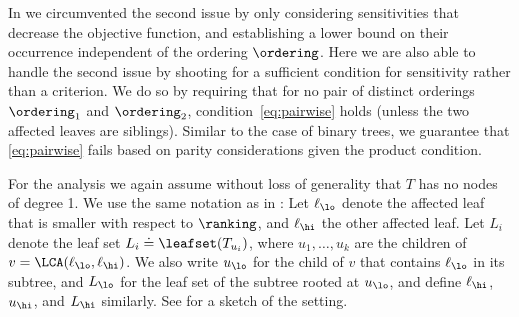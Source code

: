 In  we circumvented the second issue by only considering sensitivities that decrease the objective function, and establishing a lower bound on their occurrence independent of the ordering $\ordering$. Here we are also able to handle the second issue by shooting for a sufficient condition for sensitivity rather than a criterion. We do so by requiring that for no pair of distinct orderings $\ordering_1$ and $\ordering_2$, condition~\eqref{eq:pairwise} holds (unless the two affected leaves are siblings). Similar to the case of binary trees, we guarantee that \eqref{eq:pairwise} fails based on parity considerations given the product condition. 

For the analysis we again assume without loss of generality that $T$ has no nodes of degree 1. We use the same notation as in : Let  $\ell_\lo$ denote the affected leaf that is smaller with respect to $\ranking$, and $\ell_\hi$ the other affected leaf. Let $L_i$ denote the leaf set $L_i \doteq \leafset(T_{u_i})$, where $u_1, \dots, u_k$ are the children of $v = \LCA(\ell_\lo,\ell_\hi)$. We also write $u_\lo$ for the child of $v$ that contains $\ell_\lo$ in its subtree, and $L_\lo$ for the leaf set of the subtree rooted at $u_\lo$, and define $\ell_\hi$, $u_\hi$, and $L_\hi$ similarly. See  for a sketch of the setting.

